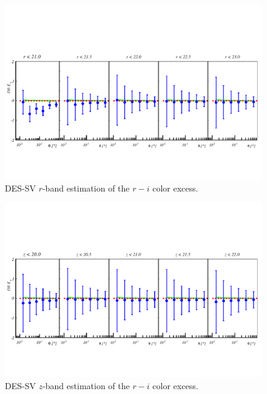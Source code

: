\begin{figure}
\includegraphics[width=\textwidth,trim={0 2.3cm 0 3.5cm},clip]{./figures_appendix/mag_r_ri.pdf}
\caption{DES-SV $r$-band estimation of the $r-i$ color excess.}
\end{figure}

\begin{figure}
\includegraphics[width=\textwidth,trim={0 2.3cm 0 3.5cm},clip]{./figures_appendix/mag_z_ri.pdf}
\caption{DES-SV $z$-band estimation of the $r-i$ color excess.}
\end{figure}

